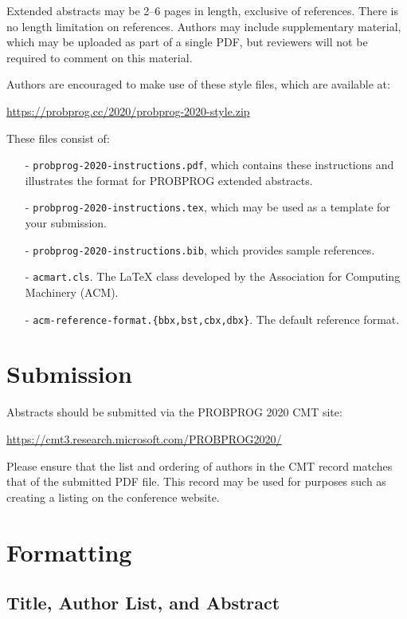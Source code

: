\documentclass[anonymous=false, %
               format=acmsmall, %
               review=true, %
               screen=true, %
               nonacm=true]{acmart}
\begin{document}
Extended abstracts may be 2--6 pages in length, exclusive of references. There is no length limitation on references. Authors may include supplementary material, which may be uploaded as part of a single PDF, but reviewers will not be required to comment on this material. 

Authors are encouraged to make use of these style files, which are available at:
\begin{center}
   \url{https://probprog.cc/2020/probprog-2020-style.zip}
\end{center}
These files consist of:
\begin{itemize}
\item[-] \verb+probprog-2020-instructions.pdf+, which  contains these instructions and illustrates the format for PROBPROG extended abstracts.

\item[-] \verb+probprog-2020-instructions.tex+, which may be used as a template for your submission. 

\item[-] \verb+probprog-2020-instructions.bib+, which provides sample references. 

\item[-] \verb+acmart.cls+. The LaTeX class developed by the Association for Computing Machinery (ACM). 

\item[-] \verb+acm-reference-format.{bbx,bst,cbx,dbx}+. The default reference format. 
\end{itemize}

\section{Submission}

Abstracts should be submitted via the PROBPROG 2020 CMT site:
\begin{center}
    \url{https://cmt3.research.microsoft.com/PROBPROG2020/}
\end{center}
Please ensure that the list and ordering of authors in the CMT record matches that of the submitted PDF file. This record may be used for purposes such as creating a listing on the conference website.

\section{Formatting}

\subsection{Title, Author List, and Abstract}
\end{document}
